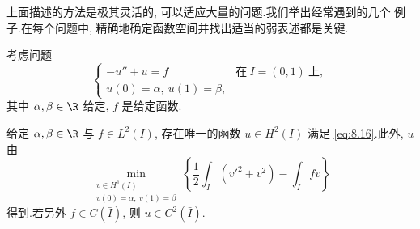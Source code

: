 上面描述的方法是极其灵活的, 可以适应大量的问题.我们举出经常遇到的几个
例子.在每个问题中, 精确地确定函数空间并找出适当的弱表述都是关键.

\begin{example}
\label{ex:8.1}
考虑问题
\begin{equation}
\begin{cases}
-u''+u=f & \text{在}\ I=(0,1)\ \text{上},\\
u(0)=\alpha,\ u(1)=\beta,
\end{cases}
\label{eq:8.16}
\end{equation}
其中 $\alpha,\beta\in\R$ 给定, $f$ 是给定函数.
\end{example}

\begin{keyproposition}
\label{prop:8.16}
给定 $\alpha,\beta\in\R$ 与 $f\in L^2(I)$, 存在唯一的函数 $u\in H^2(I)$
满足 \eqref{eq:8.16}.此外, $u$ 由
\begin{equation*}
\min_{\substack{v\in H^1(I)\\ v(0)=\alpha,\ v(1)=\beta}}
\left\{\frac12\int_I(v'^2+v^2)-\int_I fv\right\}
\end{equation*}
得到.若另外 $f\in C(\bar I)$, 则 $u\in C^2(\bar I)$.
\end{keyproposition}

